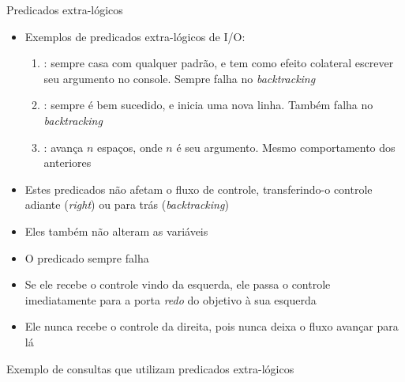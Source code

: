 \begin{frame}[fragile]{Predicados extra-lógicos}

    \begin{itemize}
        \item Exemplos de predicados extra-lógicos de I/O:

        \begin{enumerate}
            \item {}: sempre casa com qualquer padrão, e tem como efeito 
                colateral escrever seu argumento no console. Sempre falha no
                \textit{backtracking}

            \item {}: sempre é bem sucedido, e inicia uma nova linha. Também 
                falha no \textit{backtracking}

            \item {}: avança $n$ espaços, onde $n$ é seu argumento. Mesmo 
                comportamento dos anteriores
        \end{enumerate}

            \item Estes predicados não afetam o fluxo de controle, transferindo-o controle 
                adiante (\textit{right}) ou para trás (\textit{backtracking})

            \item Eles também não alteram as variáveis

            \item O predicado  sempre falha

            \item Se ele recebe o controle vindo da esquerda, ele passa o controle 
                imediatamente para a porta \textit{redo} do objetivo à sua esquerda

            \item Ele nunca recebe o controle da direita, pois nunca deixa o fluxo avançar 
                para lá
    \end{itemize}

\end{frame}

\begin{frame}[fragile]{Exemplo de consultas que utilizam predicados extra-lógicos}


\end{frame}
